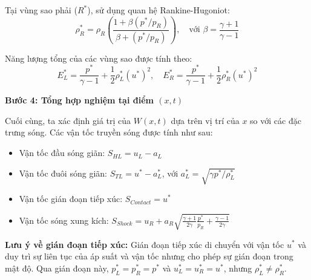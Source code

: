 Tại vùng sao phải ($R^*$), sử dụng quan hệ Rankine-Hugoniot:
\begin{equation*}
    \rho_R^* = \rho_R \left( \frac{1 + \beta (p^*/p_R)}{\beta + (p^*/p_R)} \right), \quad \text{với } \beta = \frac{\gamma+1}{\gamma-1}
\end{equation*}

Năng lượng tổng của các vùng sao được tính theo:
\begin{equation*}
    E_L^* = \frac{p^*}{\gamma-1} + \frac{1}{2}\rho_L^* (u^*)^2, \quad E_R^* = \frac{p^*}{\gamma-1} + \frac{1}{2}\rho_R^* (u^*)^2
\end{equation*}

\textbf{Bước 4: Tổng hợp nghiệm tại điểm $(x,t)$}

Cuối cùng, ta xác định giá trị của $W(x,t)$ dựa trên vị trí của $x$ so với các đặc trưng sóng. Các vận tốc truyền sóng được tính như sau:
\begin{itemize}
    \item Vận tốc đầu sóng giãn: $S_{HL} = u_L - a_L$
    \item Vận tốc đuôi sóng giãn: $S_{TL} = u^* - a_L^*$, với $a_L^* = \sqrt{\gamma p^*/\rho_L^*}$
    \item Vận tốc gián đoạn tiếp xúc: $S_{Contact} = u^*$
    \item Vận tốc sóng xung kích: $S_{Shock} = u_R + a_R \sqrt{\frac{\gamma+1}{2\gamma}\frac{p^*}{p_R} + \frac{\gamma-1}{2\gamma}}$
\end{itemize}

\textbf{Lưu ý về gián đoạn tiếp xúc:} Gián đoạn tiếp xúc di chuyển với vận tốc $u^*$ và duy trì sự liên tục của áp suất và vận tốc nhưng cho phép sự gián đoạn trong mật độ. Qua gián đoạn này, $p_L^* = p_R^* = p^*$ và $u_L^* = u_R^* = u^*$, nhưng $\rho_L^* \neq \rho_R^*$.

